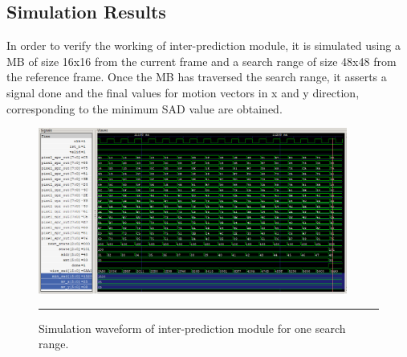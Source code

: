 \subsection{Simulation Results}
In order to verify the working of inter-prediction module, it is simulated using a MB of size 16x16 from the current frame and a search range of size 48x48 from the reference frame. Once the MB has traversed the search range, it asserts a signal done and the final values for motion vectors in x and y direction, corresponding to the minimum SAD value are obtained. 
\begin{figure}[H]
	\centering
	\includegraphics[width = 4in]{./Figures/wave2.png}
	\rule{35em}{0.5pt}
	\caption{Simulation waveform of inter-prediction module for one search range.}
	\label{fig:wave2}
\end{figure}

